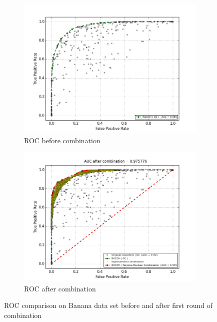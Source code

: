 \begin{figure}[H]
    \centering
    \begin{adjustbox}{minipage=\linewidth,scale=1.1}
    \begin{subfigure}[b]{0.5\columnwidth}
        \centering
        \includegraphics[width=\linewidth]{figs/ROCHLeft-Banana}
        \caption{ROC before combination}
        \label{fig:ROC_left_banana} 
    \end{subfigure}
    \begin{subfigure}[b]{0.5\columnwidth}
        \centering
        \includegraphics[width=\linewidth]{figs/ROCHRight-Banana}
        \caption{ROC after combination}
        \label{fig:ROC_right_banana}
    \end{subfigure}
    \caption{ROC comparison on Banana data set before and after first round of combination}
    \label{fig:ROC_comparison_banana}
    \end{adjustbox}
\end{figure}

